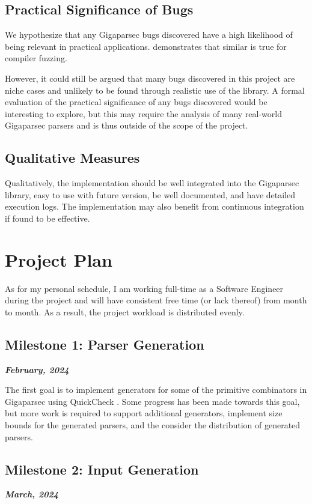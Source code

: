 \documentclass[11pt]{article}
\let\oldciteauthor\citeauthor
\renewcommand{\citeauthor}[1]{\oldciteauthor{#1} \cite{#1}}
\newcommand{\be}[1]{\textbf{\emph{#1}}}
\begin{document}
\subsection{Practical Significance of Bugs}

We hypothesize that any Gigaparsec bugs discovered have a high likelihood of being relevant in practical applications. \citeauthor{fuzzing-importance} demonstrates that similar is true for compiler fuzzing.

However, it could still be argued that many bugs discovered in this project are niche cases and unlikely to be found through realistic use of the library. A formal evaluation of the practical significance of any bugs discovered would be interesting to explore, but this may require the analysis of many real-world Gigaparsec parsers and is thus outside of the scope of the project.

\subsection{Qualitative Measures}

Qualitatively, the implementation should be well integrated into the Gigaparsec library, easy to use with future version, be well documented, and have detailed execution logs. The implementation may also benefit from continuous integration if found to be effective.

\section{Project Plan}

As for my personal schedule, I am working full-time as a Software Engineer during the project and will have consistent free time (or lack thereof) from month to month. As a result, the project workload is distributed evenly.

\subsection{Milestone 1: Parser Generation}
\be{February, 2024}

The first goal is to implement generators for some of the primitive combinators in Gigaparsec using QuickCheck \cite{quickcheck}. Some progress has been made towards this goal, but more work is required to support additional generators, implement size bounds for the generated parsers, and the consider the distribution of generated parsers.

\subsection{Milestone 2: Input Generation}
\be{March, 2024}
\end{document}
